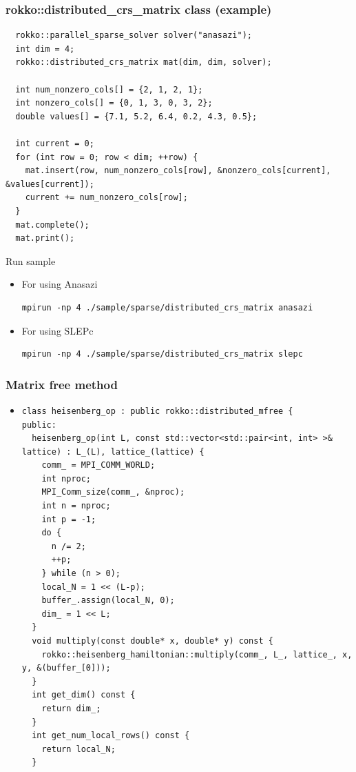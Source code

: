 \begin{frame}[c,fragile]
  \frametitle{rokko::distributed_crs_matrix class (example)}
\begin{lstlisting}
  rokko::parallel_sparse_solver solver("anasazi");
  int dim = 4;
  rokko::distributed_crs_matrix mat(dim, dim, solver);

  int num_nonzero_cols[] = {2, 1, 2, 1};
  int nonzero_cols[] = {0, 1, 3, 0, 3, 2};
  double values[] = {7.1, 5.2, 6.4, 0.2, 4.3, 0.5};

  int current = 0;
  for (int row = 0; row < dim; ++row) {
    mat.insert(row, num_nonzero_cols[row], &nonzero_cols[current], &values[current]);
    current += num_nonzero_cols[row];
  }
  mat.complete();
  mat.print();
\end{lstlisting}
\noindent
Run sample
  \begin{itemize}
  \item For using Anasazi
\begin{lstlisting}[style=shstyle]
mpirun -np 4 ./sample/sparse/distributed_crs_matrix anasazi
\end{lstlisting}
  \item For using SLEPc
\begin{lstlisting}[style=shstyle]
mpirun -np 4 ./sample/sparse/distributed_crs_matrix slepc
\end{lstlisting}
  \end{itemize}
\end{frame}


\begin{frame}[c,fragile]
  \frametitle{Matrix free method}
  \begin{itemize}
  \item {}
\begin{lstlisting}
class heisenberg_op : public rokko::distributed_mfree {
public:
  heisenberg_op(int L, const std::vector<std::pair<int, int> >& lattice) : L_(L), lattice_(lattice) {
    comm_ = MPI_COMM_WORLD;
    int nproc;
    MPI_Comm_size(comm_, &nproc);
    int n = nproc;
    int p = -1;
    do {
      n /= 2;
      ++p;
    } while (n > 0);
    local_N = 1 << (L-p);
    buffer_.assign(local_N, 0);
    dim_ = 1 << L;
  }
  void multiply(const double* x, double* y) const {
    rokko::heisenberg_hamiltonian::multiply(comm_, L_, lattice_, x, y, &(buffer_[0]));
  }
  int get_dim() const {
    return dim_;
  }
  int get_num_local_rows() const {
    return local_N;
  }
\end{lstlisting}
  \end{itemize}
\end{frame}

